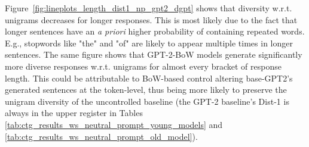 
Figure~\ref{fig:lineplots_length_dist1_np_gpt2_dgpt} shows that diversity w.r.t. unigrams decreases for longer responses. This is most likely due to the fact that longer sentences have an \textit{a priori} higher probability of containing repeated words. E.g., stopwords like "the" and "of" are likely to appear multiple times in longer sentences. The same figure shows that GPT-2-BoW models generate significantly more diverse responses w.r.t. unigrams for almost every bracket of response length. This could be attributable to BoW-based control altering base-GPT2's generated sentences at the token-level, thus being more likely to preserve the unigram diversity of the uncontrolled baseline (the GPT-2 baseline's Dist-1 is always in the upper register in Tables \ref{tab:ctg_results_ws_neutral_prompt_young_models} and \ref{tab:ctg_results_ws_neutral_prompt_old_model}).

